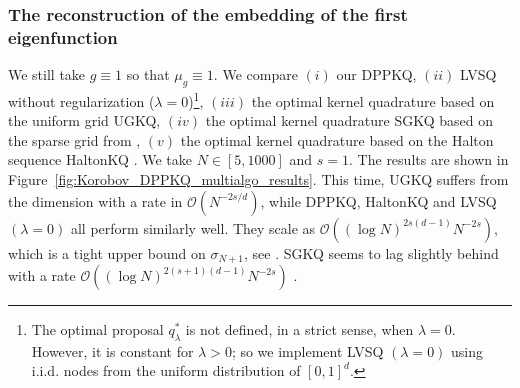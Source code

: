 \documentclass[twoside,11pt]{book}
\numberwithin{theorem}{chapter}
\numberwithin{definition}{chapter}
\numberwithin{proposition}{chapter}
\numberwithin{corollary}{chapter}
\numberwithin{example}{chapter}
\numberwithin{lemma}{chapter}
\numberwithin{assumption}{chapter}
\numberwithin{equation}{chapter}
\numberwithin{figure}{chapter}
\begin{document}
\subsubsection{The reconstruction of the embedding of the first eigenfunction}
We still take $g\equiv 1$ so that $\mu_{g} \equiv 1$. We compare $(i)$ our DPPKQ, $(ii)$ LVSQ without regularization ($\lambda =0$)\footnote{The optimal proposal $q_{\lambda}^*$ is not defined, in a strict sense, when $\lambda = 0$. However, it is constant for $\lambda>0$; so we implement LVSQ $(\lambda = 0)$ using i.i.d. nodes from the uniform distribution of $[0,1]^{d}$.}, $(iii)$ the optimal kernel quadrature based on the uniform grid UGKQ, $(iv)$ the optimal kernel quadrature SGKQ based on the sparse grid from \parencite{Smo63}, $(v)$ the optimal kernel quadrature based on the Halton sequence HaltonKQ \parencite{Hal64}. We take $N \in [5,1000]$ and $s =1$. The results are shown in Figure~\ref{fig:Korobov_DPPKQ_multialgo_results}. This time, UGKQ suffers from the dimension with a rate in $\mathcal{O}(N^{-2s/d})$, while DPPKQ, HaltonKQ and LVSQ $(\lambda = 0)$ all perform similarly well. They scale as $\mathcal{O}((\log N)^{2s(d-1)} N^{-2s})$, which is a tight upper bound on $\sigma_{N+1}$, see \parencite{Bac17}.
 SGKQ seems to lag slightly behind with a rate $\mathcal{O}((\log N)^{2(s+1)(d-1)} N^{-2s})$ 
 \parencite{Hol08,Smo63}.
\end{document}
